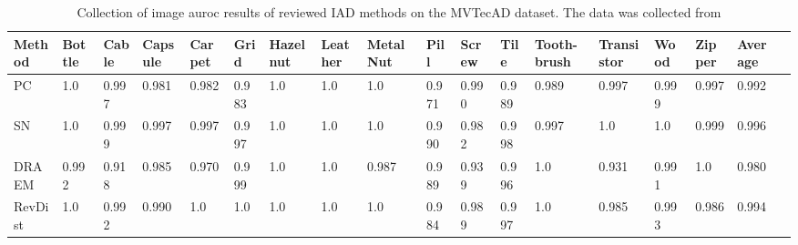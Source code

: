\begin{table}[htbp]
    \tiny
    \centering
    \begin{tabularx}{\textwidth}{|X|X|X|X|X|X|X|X|X|X|X|X|X|X|X|X|X|X|}%
        \hline
        \textbf{Method} & \textbf{Bottle} & \textbf{Cable} & \textbf{Capsule} & \textbf{Carpet} & \textbf{Grid} & \textbf{Hazelnut} & \textbf{Leather} & \textbf{Metal Nut} & \textbf{Pill} & \textbf{Screw} & \textbf{Tile} & \textbf{Tooth-brush} & \textbf{Transistor} & \textbf{Wood} & \textbf{Zipper} & \textbf{Average} \\
        \hline
        PC \cite{patchCore2022} & 1.0 & 0.997 & 0.981 & 0.982 & 0.983 & 1.0 & 1.0 & 1.0 & 0.971 & 0.990 & 0.989 & 0.989 & 0.997 & 0.999 & 0.997 & 0.992 \\
        \hline
        SN \cite{liu2023simplenet} & 1.0 & 0.999 & 0.997 & 0.997 & 0.997 & 1.0 & 1.0 & 1.0 & 0.990 & 0.982 & 0.998 & 0.997 & 1.0 & 1.0 & 0.999 & 0.996 \\
       \hline
        DRAEM \cite{Zavrtanik_2021DRAEM} & 0.992 & 0.918 & 0.985 & 0.970 & 0.999 & 1.0 & 1.0 & 0.987 & 0.989 & 0.939 & 0.996 & 1.0 & 0.931 & 0.991 & 1.0 & 0.980 \\
        \hline
        RevDist \cite{revdist2023} & 1.0 & 0.992 & 0.990 & 1.0 & 1.0 & 1.0 & 1.0 & 1.0 & 0.984 & 0.989 & 0.997 & 1.0 & 0.985 & 0.993 & 0.986 & 0.994 \\
        \hline
    \end{tabularx}
    \caption{Collection of image auroc results of reviewed IAD methods on the MVTecAD \cite{MVTEC_Bergmann_2021} dataset. The data was collected from \cite{liu2024deep} \cite{liu2023simplenet} \cite{Zavrtanik_2021DRAEM} \cite{revdist2023}}
    \label{tab:imageaurocmvtec}
\end{table}

